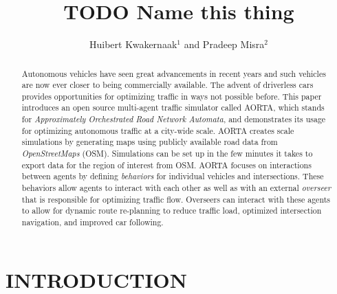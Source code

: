 \documentclass[letterpaper, 10 pt, conference]{ieeeconf}  %
\title{\LARGE \bf
TODO Name this thing
}
\author{Huibert Kwakernaak$^{1}$ and Pradeep Misra$^{2}$%
}
\begin{document}
\maketitle
\thispagestyle{empty}
\pagestyle{empty}


\begin{abstract}
Autonomous vehicles have seen great advancements in recent years and such vehicles are now ever closer to being commercially available. The advent of driverless cars provides opportunities for optimizing traffic in ways not possible before. This paper introduces an open source multi-agent traffic simulator called AORTA, which stands for \textit{Approximately Orchestrated Road Network Automata}, and demonstrates its usage for optimizing autonomous traffic at a city-wide scale. AORTA creates scale simulations by generating maps using publicly available road data from \textit{OpenStreetMaps} (OSM). Simulations can be set up in the few minutes it takes to export data for the region of interest from OSM. AORTA focuses on interactions between agents by defining \textit{behaviors} for individual vehicles and intersections. These behaviors allow agents to interact with each other as well as with an external \textit{overseer} that is responsible for optimizing traffic flow. Overseers can interact with these agents to allow for dynamic route re-planning to reduce traffic load, optimized intersection navigation, and improved car following. 
\end{abstract}


\section{INTRODUCTION}


\end{document}
